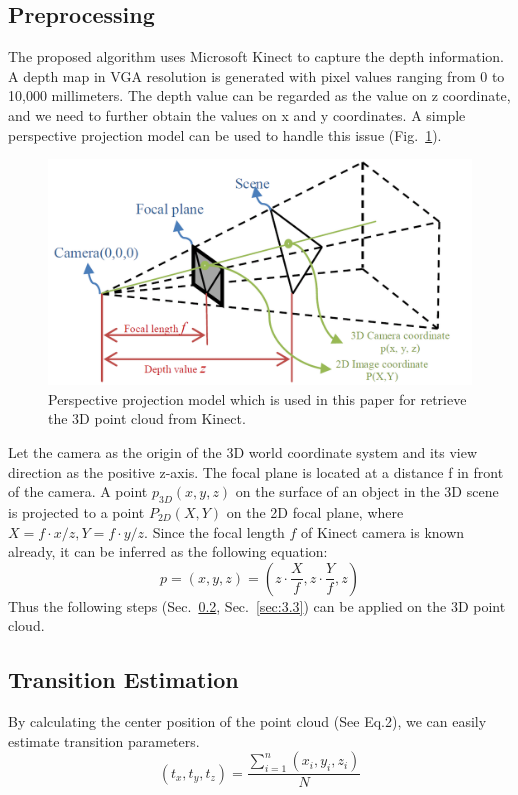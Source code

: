 \subsection{Preprocessing}
\label{sec:3.1}
The proposed algorithm uses Microsoft Kinect to capture the depth information. A depth map in VGA resolution is generated with pixel values ranging from 0 to 10,000 millimeters. The depth value can be regarded as the value on z coordinate, and we need to further obtain the values on x and y coordinates. A simple perspective projection model can be used to handle this issue (Fig.~\ref{fig:5}).

\begin{figure}
\includegraphics[width=1.0\linewidth]{./fig5.png}
\caption{Perspective projection model which is used in this paper for retrieve the 3D point cloud from Kinect.}
\label{fig:5}       %
\end{figure}

Let the camera as the origin of the 3D world coordinate system and its view direction as the positive z-axis. The focal plane is located at a distance f in front of the camera. A point $p_{3D}(x, y, z)$ on the surface of an object in the 3D scene is projected to a point $P_{2D}(X, Y)$ on the 2D focal plane, where $X=f\cdot x/z, Y=f\cdot y/z$. Since the focal length $f$ of Kinect camera is known already, it can be inferred as the following equation:
\begin{equation}
p=(x,y,z)=(z\cdot \frac{X}{f}, z\cdot \frac{Y}{f}, z)
\end{equation}
Thus the following steps (Sec.~\ref{sec:3.2}, Sec.~\ref{sec:3.3}) can be applied on the 3D point cloud.

\subsection{Transition Estimation}
\label{sec:3.2}
By calculating the center position of the point cloud (See Eq.2), we can easily estimate transition parameters.
\begin{equation}
(t_{x},t_{y},t_{z})=\frac{\sum_{i=1}^n{(x_{i},y_{i},z_{i})}}{N}
\end{equation}

